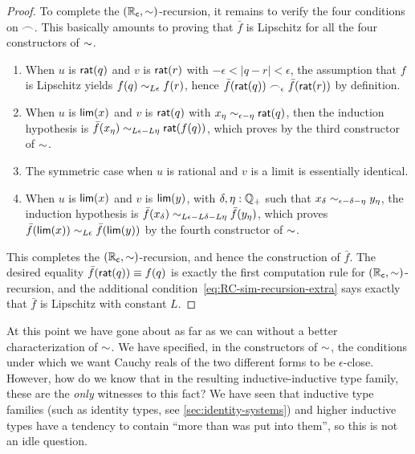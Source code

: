 \begin{proof}
  To complete the $(\mathbb{R}_\mathsf{c},\mathord\sim)$-recursion, it remains to verify the four conditions on $\frown$.
  This basically amounts to proving that $\bar f$ is Lipschitz for all the four constructors of $\mathord\sim$.
  \begin{enumerate}
  \item When $u$ is $\mathsf{rat}(q)$ and $v$ is $\mathsf{rat}(r)$ with $-\epsilon < |q-r| <\epsilon$, the assumption that $f$ is Lipschitz yields $f(q) \sim_{L\epsilon} f(r)$, hence $\bar{f}(\mathsf{rat}(q)) \frown_\epsilon \bar{f}(\mathsf{rat}(r))$ by definition.
  \item When $u$ is $\mathsf{lim}(x)$ and $v$ is $\mathsf{rat}(q)$ with $x_\eta \sim_{\epsilon - \eta} \mathsf{rat}(q)$, then the
      induction hypothesis is $\bar{f}(x_\eta) \sim_{L \epsilon - L \eta} \mathsf{rat}(f(q))$, which proves
      by the third constructor of $\mathord\sim$.
  \item The symmetric case when $u$ is rational and $v$ is a limit is essentially identical.
  \item When $u$ is $\mathsf{lim}(x)$ and $v$ is $\mathsf{lim}(y)$, with $\delta, \eta : \mathbb{Q}_{+}$ such that $x_\delta \sim_{\epsilon - \delta - \eta} y_\eta$,
      the induction hypothesis is $\bar{f}(x_\delta) \sim_{L \epsilon - L \delta - L \eta} \bar{f}(y_\eta)$, which proves $\bar{f}(\mathsf{lim}(x)) \sim_{L
        \epsilon} \bar{f}(\mathsf{lim}(y))$ by the fourth constructor of $\mathord\sim$.
  \end{enumerate}
  This completes the $(\mathbb{R}_\mathsf{c},\mathord\sim)$-recursion, and hence the construction of $\bar f$.
  The desired equality $\bar f(\mathsf{rat}(q))\equiv f(q)$ is exactly the first computation rule for $(\mathbb{R}_\mathsf{c},\mathord\sim)$-recursion, and the additional condition~\eqref{eq:RC-sim-recursion-extra} says exactly that $\bar f$ is Lipschitz with constant $L$.
\end{proof}

At this point we have gone about as far as we can without a better characterization of $\mathord\sim$.
We have specified, in the constructors of $\mathord\sim$, the conditions under which we want Cauchy reals of the two different forms to be $\epsilon$-close.
However, how do we know that in the resulting inductive-inductive type family, these are the \emph{only} witnesses to this fact?
We have seen that inductive type families (such as identity types, see \autoref{sec:identity-systems}) and higher inductive types have a tendency to contain ``more than was put into them'', so this is not an idle question.

